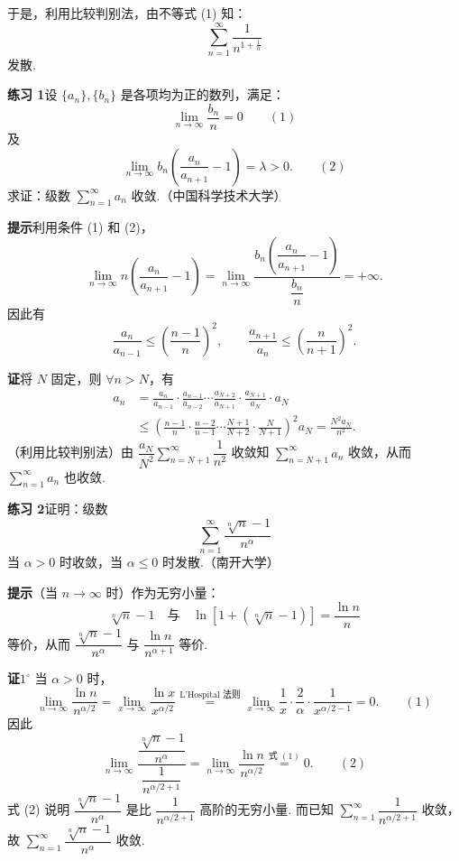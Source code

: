 \documentclass[UTF8,12pt,a4paper,fontset=fandol]{ctexart}
\begin{document}
于是，利用比较判别法，由不等式 (1) 知：
\[
  \sum_{n=1}^\infty\frac1{n^{1+\frac1n}}
\]
发散.

\noindent\textbf{练习 1}\quad 设 $\{a_n\},\{b_n\}$ 是各项均为正的数列，满足：
\[
  \lim_{n\to\infty}\frac{b_n}{n}=0
\qquad(1)
\]
及
\[
  \lim_{n\to\infty} b_n\left(\frac{a_n}{a_{n+1}}-1\right)=\lambda>0.
\qquad(2)
\]
求证：级数 $\displaystyle\sum_{n=1}^\infty a_n$ 收敛.（中国科学技术大学）

\noindent\textbf{提示}\quad 利用条件 (1) 和 (2)，
\[
  \lim_{n\to\infty}n\left(\frac{a_n}{a_{n+1}}-1\right)
  =\lim_{n\to\infty}
  \frac{b_n\left(\dfrac{a_n}{a_{n+1}}-1\right)}{\dfrac{b_n}{n}}
  =+\infty.
\]
因此有
\[
  \frac{a_n}{a_{n-1}}\le\left(\frac{n-1}{n}\right)^2,\qquad
  \frac{a_{n+1}}{a_n}\le\left(\frac n{n+1}\right)^2.
\]

\noindent\textbf{证}\quad 将 $N$ 固定，则 $\forall n>N$，有
\[
\begin{aligned}
a_n
&=\frac{a_n}{a_{n-1}}\cdot\frac{a_{n-1}}{a_{n-2}}\cdots
  \frac{a_{N+2}}{a_{N+1}}\cdot\frac{a_{N+1}}{a_N}\cdot a_N\\
&\le\left(\frac{n-1}{n}\cdot\frac{n-2}{n-1}\cdots
  \frac{N+1}{N+2}\cdot\frac N{N+1}\right)^2a_N
=\frac{N^2a_N}{n^2}.
\end{aligned}
\]
（利用比较判别法）由 $\dfrac{a_N}{N^2}\sum_{n=N+1}^\infty\dfrac1{n^2}$ 收敛知 $\displaystyle\sum_{n=N+1}^\infty a_n$ 收敛，从而 $\displaystyle\sum_{n=1}^\infty a_n$ 也收敛.

\noindent\textbf{练习 2}\quad 证明：级数
\[
  \sum_{n=1}^\infty\frac{\sqrt[n]{n}-1}{n^\alpha}
\]
当 $\alpha>0$ 时收敛，当 $\alpha\le0$ 时发散.（南开大学）

\noindent\textbf{提示}\quad （当 $n\to\infty$ 时）作为无穷小量：
\[
  \sqrt[n]{n}-1
  \quad\text{与}\quad
  \ln[1+(\sqrt[n]{n}-1)]=\frac{\ln n}{n}
\]
等价，从而 $\dfrac{\sqrt[n]{n}-1}{n^\alpha}$ 与 $\dfrac{\ln n}{n^{\alpha+1}}$ 等价.

\noindent\textbf{证}\quad $1^\circ$ 当 $\alpha>0$ 时，
\[
  \lim_{n\to\infty}\frac{\ln n}{n^{\alpha/2}}
  =\lim_{x\to\infty}\frac{\ln x}{x^{\alpha/2}}
  \stackrel{\text{L'Hospital 法则}}{=}
  \lim_{x\to\infty}\frac1x\cdot\frac2\alpha\cdot\frac1{x^{\alpha/2-1}}=0.
\qquad(1)
\]
因此
\[
  \lim_{n\to\infty}
  \frac{\dfrac{\sqrt[n]{n}-1}{n^\alpha}}{\dfrac1{n^{\alpha/2+1}}}
  =\lim_{n\to\infty}\frac{\ln n}{n^{\alpha/2}}
  \stackrel{\text{式 }(1)}{=}0.
\qquad(2)
\]
式 (2) 说明 $\dfrac{\sqrt[n]{n}-1}{n^\alpha}$ 是比 $\dfrac1{n^{\alpha/2+1}}$ 高阶的无穷小量. 而已知 $\displaystyle\sum_{n=1}^\infty\dfrac1{n^{\alpha/2+1}}$ 收敛，故 $\displaystyle\sum_{n=1}^\infty\dfrac{\sqrt[n]{n}-1}{n^\alpha}$ 收敛.
\end{document}
